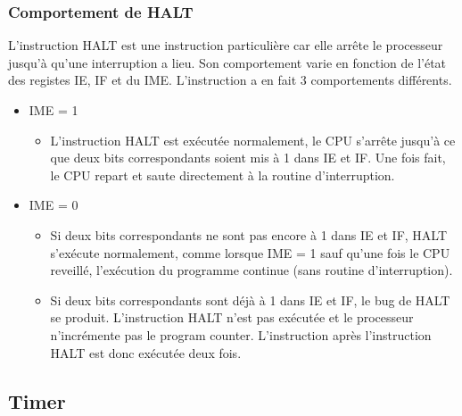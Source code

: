 \documentclass[a4paper]{article}
\begin{document}
\subsubsection{Comportement de HALT}
L'instruction HALT est une instruction particulière car elle arrête le processeur
jusqu'à qu'une interruption a lieu. Son comportement varie en fonction de l'état
des registes IE, IF et du IME. L'instruction a en fait 3 comportements
différents.
\begin{itemize}[label=\textbullet]
	\item IME = 1
	\begin{itemize}[label=\textbullet]
		\item L'instruction HALT est exécutée normalement, le CPU s'arrête jusqu'à
		ce que deux bits correspondants soient mis à 1 dans IE et IF. Une fois fait,
		le CPU repart et saute directement à la routine d'interruption.
	\end{itemize}
	\item IME = 0
	\begin{itemize}[label=\textbullet]
		\item Si deux bits correspondants ne sont pas encore à 1 dans IE et IF, HALT 
		s'exécute normalement, comme lorsque IME = 1 sauf qu'une fois le CPU reveillé,
		l'exécution du programme continue (sans routine d'interruption).
		\item Si deux bits correspondants sont déjà à 1 dans IE et IF, le bug de HALT
		se produit. L'instruction HALT n'est pas exécutée et le processeur n'incrémente
		pas le program counter. L'instruction après l'instruction HALT est donc exécutée
		deux fois.
	\end{itemize}
\end{itemize}


\subsection{Timer}
\end{document}
